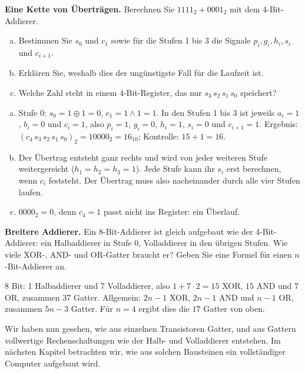 \begin{mychallenge}\label{mychallenge:volladdierer-uebertragskette}
    \textbf{Eine Kette von Überträgen.}
    Berechnen Sie $1111_2 + 0001_2$ mit dem 4-Bit-Addierer.
    \begin{enumerate}[(a)]
        \item Bestimmen Sie $s_0$ und $c_1$ sowie für die Stufen 1 bis 3 die Signale $p_i, g_i, h_i, s_i$ und $c_{i+1}$.
        \item Erklären Sie, weshalb dies der ungünstigste Fall für die Laufzeit ist.
        \item Welche Zahl steht in einem 4-Bit-Register, das nur $s_3\,s_2\,s_1\,s_0$ speichert?
    \end{enumerate}
    \begin{myanswer}
        \begin{enumerate}[(a)]
            \item Stufe 0: $s_0 = 1 \oplus 1 = 0$, $c_1 = 1 \land 1 = 1$. In den Stufen 1 bis 3 ist jeweils $a_i = 1$, $b_i = 0$ und $c_i = 1$, also $p_i = 1$, $g_i = 0$, $h_i = 1$, $s_i = 0$ und $c_{i+1} = 1$. Ergebnis: $(c_4\,s_3\,s_2\,s_1\,s_0)_2 = 10000_2 = 16_{10}$; Kontrolle: $15 + 1 = 16$.
            \item Der Übertrag entsteht ganz rechts und wird von jeder weiteren Stufe weitergereicht ($h_1 = h_2 = h_3 = 1$). Jede Stufe kann ihr $s_i$ erst berechnen, wenn $c_i$ feststeht. Der Übertrag muss also nacheinander durch alle vier Stufen laufen.
            \item $0000_2 = 0$, denn $c_4 = 1$ passt nicht ins Register: ein Überlauf.
        \end{enumerate}
    \end{myanswer}
\end{mychallenge}

\begin{mychallenge}\label{mychallenge:addierer-gatteranzahl}
    \textbf{Breitere Addierer.}
    Ein 8-Bit-Addierer ist gleich aufgebaut wie der 4-Bit-Addierer: ein Halbaddierer in Stufe 0, Volladdierer in den übrigen Stufen. Wie viele XOR-, AND- und OR-Gatter braucht er? Geben Sie eine Formel für einen $n$-Bit-Addierer an.
    \begin{myanswer}
        8 Bit: 1 Halbaddierer und 7 Volladdierer, also $1 + 7 \cdot 2 = 15$ XOR, $15$ AND und $7$ OR, zusammen $37$ Gatter.
        Allgemein: $2n - 1$ XOR, $2n - 1$ AND und $n - 1$ OR, zusammen $5n - 3$ Gatter. Für $n = 4$ ergibt dies die $17$ Gatter von oben.
    \end{myanswer}
\end{mychallenge}

Wir haben nun gesehen, wie aus einzelnen Transistoren Gatter, und aus Gattern vollwertige Rechenschaltungen wie der Halb- und Volladdierer entstehen. Im nächsten Kapitel betrachten wir, wie aus solchen Bausteinen ein vollständiger Computer aufgebaut wird.
